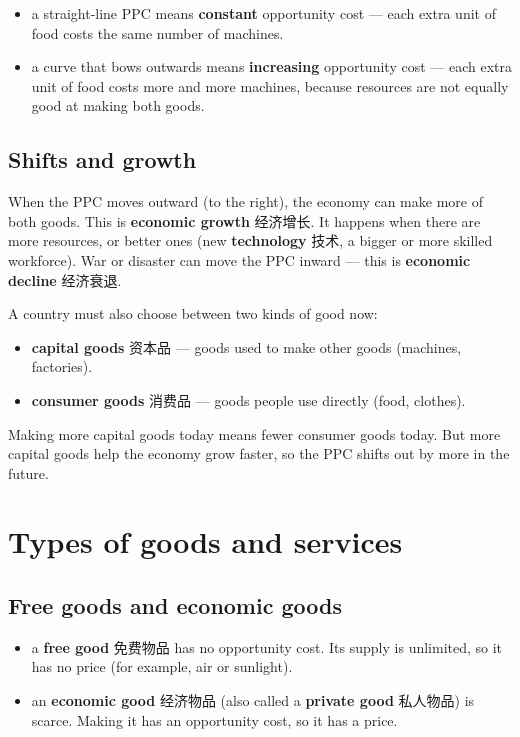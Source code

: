 \documentclass[11pt]{article}
\begin{document}
\begin{itemize}
\item a straight-line PPC means \textbf{constant} opportunity cost — each extra unit of food costs the same number of machines.

\item a curve that bows outwards means \textbf{increasing} opportunity cost — each extra unit of food costs more and more machines, because resources are not equally good at making both goods.

\end{itemize}

\subsection*{Shifts and growth}

When the PPC moves outward (to the right), the economy can make more of both goods. This is \textbf{economic growth} 经济增长. It happens when there are more resources, or better ones (new \textbf{technology} 技术, a bigger or more skilled workforce). War or disaster can move the PPC inward — this is \textbf{economic decline} 经济衰退.

A country must also choose between two kinds of good now:

\begin{itemize}
\item \textbf{capital goods} 资本品 — goods used to make other goods (machines, factories).

\item \textbf{consumer goods} 消费品 — goods people use directly (food, clothes).

\end{itemize}

Making more capital goods today means fewer consumer goods today. But more capital goods help the economy grow faster, so the PPC shifts out by more in the future.

\section*{Types of goods and services}

\subsection*{Free goods and economic goods}

\begin{itemize}
\item a \textbf{free good} 免费物品 has no opportunity cost. Its supply is unlimited, so it has no price (for example, air or sunlight).

\item an \textbf{economic good} 经济物品 (also called a \textbf{private good} 私人物品) is scarce. Making it has an opportunity cost, so it has a price.

\end{itemize}
\end{document}
